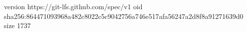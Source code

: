 version https://git-lfs.github.com/spec/v1
oid sha256:864471093968a482c8022c5c9042756a746e517afa56247a2d8f8a91271639d0
size 1737
